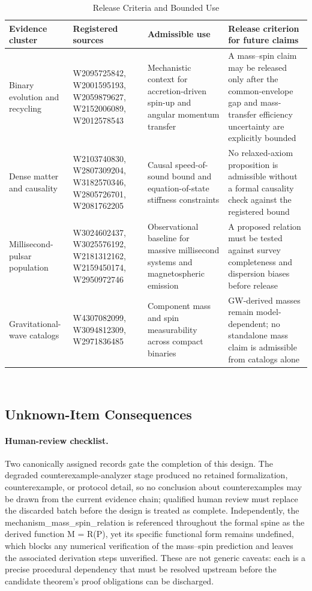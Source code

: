 \documentclass[conference]{IEEEtran}
\begin{document}
\begin{table}[htbp]
\centering
\footnotesize
\setlength{\tabcolsep}{3pt}
\renewcommand{\arraystretch}{1.12}
\caption{Release Criteria and Bounded Use}
\label{tab:appendix-evidence-and-review-block-2}
\begin{tabular}{|p{}|p{}|p{}|p{}|}
\hline
Evidence cluster & Registered sources & Admissible use & Release criterion for future claims \\\hline
Binary evolution and recycling & W2095725842, W2001595193, W2059879627, W2152006089, W2012578543 & Mechanistic context for accretion-driven spin-up and angular momentum transfer & A mass--spin claim may be released only after the common-envelope gap and mass-transfer efficiency uncertainty are explicitly bounded \\\hline
Dense matter and causality & W2103740830, W2807309204, W3182570346, W2805726701, W2081762205 & Causal speed-of-sound bound and equation-of-state stiffness constraints & No relaxed-axiom proposition is admissible without a formal causality check against the registered bound \\\hline
Millisecond-pulsar population & W3024602437, W3025576192, W2181312162, W2159450174, W2950972746 & Observational baseline for massive millisecond systems and magnetospheric emission & A proposed relation must be tested against survey completeness and dispersion biases before release \\\hline
Gravitational-wave catalogs & W4307082099, W3094812309, W2971836485 & Component mass and spin measurability across compact binaries & GW-derived masses remain model-dependent; no standalone mass claim is admissible from catalogs alone \\\hline
\end{tabular}
\end{table}~\cite{cite_1e5d552669fc0c56,cite_42e341ff6471ce89,cite_55957f4ce67bd972,cite_c369df652181e8f7,cite_f86eeddde0fc217f,cite_fd6df2b02dbddc60}

\subsection{Unknown-Item Consequences}
\paragraph{Human-review checklist.} Two canonically assigned records gate the completion of this design. The degraded counterexample-analyzer stage produced no retained formalization, counterexample, or protocol detail, so no conclusion about counterexamples may be drawn from the current evidence chain; qualified human review must replace the discarded batch before the design is treated as complete. Independently, the mechanism\_mass\_spin\_relation is referenced throughout the formal spine as the derived function M = R(P), yet its specific functional form remains undefined, which blocks any numerical verification of the mass--spin prediction and leaves the associated derivation steps unverified. These are not generic caveats: each is a precise procedural dependency that must be resolved upstream before the candidate theorem's proof obligations can be discharged.
\end{document}
